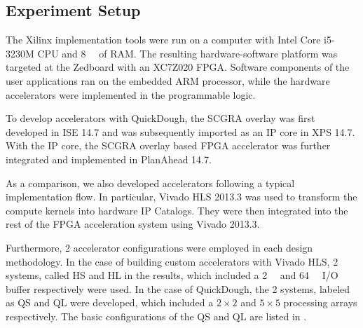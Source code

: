 \begin{table}
\end{table}


\subsection{Experiment Setup} \label{subsec:setup}
The Xilinx implementation tools were run on a computer with Intel Core i5-3230M CPU and
\SI{8}{\giga\byte} of RAM. The resulting hardware-software platform was targeted at the Zedboard with
an XC7Z020 FPGA. Software components of the user applications ran on the embedded ARM processor,
while the hardware accelerators were implemented in the programmable logic.

To develop accelerators with QuickDough, the SCGRA overlay was first developed in ISE 14.7 and was
subsequently imported as an IP core in XPS 14.7. With the IP core, the SCGRA overlay based FPGA
accelerator was further integrated and implemented in PlanAhead 14.7.

As a comparison, we also developed accelerators following a typical implementation flow.
In particular, Vivado HLS 2013.3 was used to transform the compute kernels into hardware IP Catalogs.
They were then integrated into the rest of the FPGA acceleration system using Vivado 2013.3.

Furthermore, 2 accelerator configurations were employed in each design methodology. In the case of
building custom accelerators with Vivado HLS, 2 systems, called HS and HL in the
results, which included a \SI{2}{\kilo\byte} and \SI{64}{\kilo\byte} I/O buffer respectively were
used. In the case of QuickDough, the 2 systems, labeled as QS and QL were developed,
which included a $2\times 2$ and $5 \times 5$ processing arrays respectively. The basic
configurations of the QS and QL are listed in .


